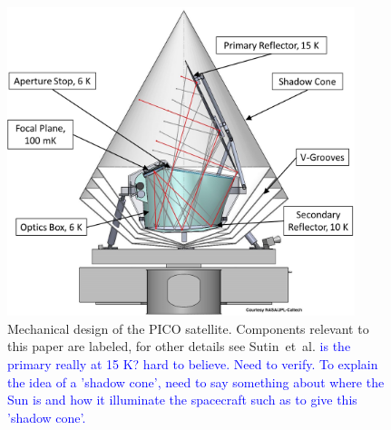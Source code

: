 \documentclass[]{spie}  %
\newcommand{\comb}[1]{\textcolor{blue}{#1}}
\begin{document}
\begin{figure} [ht]
\begin{center}
\includegraphics[height=9cm]{PICO_CAD_annotated.png}
\end{center}
\caption { \label{fig:cad} 
Mechanical design of the PICO satellite. Components relevant to this paper are labeled, for other details see Sutin~et~al.\cite{brian_spie}
\comb{is the primary really at 15 K? hard to believe. Need to verify. To explain the idea of a 'shadow cone', need to say something 
about where the Sun is and how it illuminate the spacecraft such as to give this 'shadow cone'. } 
}
\end{figure} 


\end{document}
